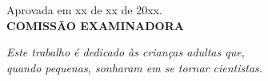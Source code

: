 \documentclass[
  12pt,
  oneside,
  a4paper,
  chapter=TITLE,
  section=TITLE,
  subsubsection=TITLE,
  brazil]{abntex2}
\begin{document}
\begin{folhadeaprovacao}

  \begin{center}
    {\ABNTEXchapterfont\large\imprimirautor}

    \vspace*{\fill}\vspace*{\fill}
    \begin{center}
      \ABNTEXchapterfont\bfseries\Large\imprimirtitulo
    \end{center}
    \vspace*{\fill}
    
    \hspace{.45\textwidth}
    \begin{minipage}{.5\textwidth}
        \imprimirpreambulo
        \vspace*{1cm}
        Aprovada em xx de xx de 20xx.\\[2cm]
        \textbf{COMISSÃO EXAMINADORA} \\
    \end{minipage}%
   \end{center}
  
\end{folhadeaprovacao}

\begin{dedicatoria}
   \vspace*{\fill}
   \centering
   \noindent
   \textit{ Este trabalho é dedicado às crianças adultas que,\\
   quando pequenas, sonharam em se tornar cientistas.} \vspace*{\fill}
\end{dedicatoria}
\end{document}
